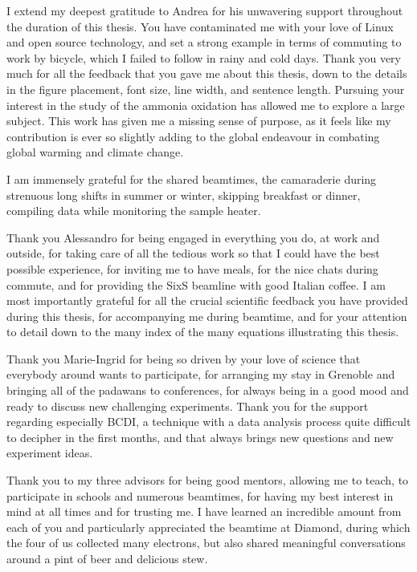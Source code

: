 I extend my deepest gratitude to Andrea for his unwavering support throughout the duration of this thesis.
You have contaminated me with your love of Linux and open source technology, and set a strong example in terms of commuting to work by bicycle, which I failed to follow in rainy and cold days.
Thank you very much for all the feedback that you gave me about this thesis, down to the details in the figure placement, font size, line width, and sentence length.
Pursuing your interest in the study of the ammonia oxidation has allowed me to explore a large subject.
This work has given me a missing sense of purpose, as it feels like my contribution is ever so slightly adding to the global endeavour in combating global warming and climate change.

I am immensely grateful for the shared beamtimes, the camaraderie during strenuous long shifts in summer or winter, skipping breakfast or dinner, compiling data while monitoring the sample heater.

Thank you Alessandro for being engaged in everything you do, at work and outside, for taking care of all the tedious work so that I could have the best possible experience, for inviting me to have meals, for the nice chats during commute, and for providing the SixS beamline with good Italian coffee.
I am most importantly grateful for all the crucial scientific feedback you have provided during this thesis, for accompanying me during beamtime, and for your attention to detail down to the many index of the many equations illustrating this thesis.

Thank you Marie-Ingrid for being so driven by your love of science that everybody around wants to participate, for arranging my stay in Grenoble and bringing all of the padawans to conferences, for always being in a good mood and ready to discuss new challenging experiments.
Thank you for the support regarding especially BCDI, a technique with a data analysis process quite difficult to decipher in the first months, and that always brings new questions and new experiment ideas.

Thank you to my three advisors for being good mentors, allowing me to teach, to participate in schools and numerous beamtimes, for having my best interest in mind at all times and for trusting me.
I have learned an incredible amount from each of you and particularly appreciated the beamtime at Diamond, during which the four of us collected many electrons, but also shared meaningful conversations around a pint of beer and delicious stew.

